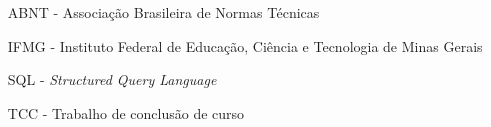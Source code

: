 \begin{itemize}[]
\item[ABNT] - Associação Brasileira de Normas Técnicas
\item[IFMG] - Instituto Federal de Educação, Ciência e Tecnologia de Minas Gerais
\item[SQL] - \textit{Structured Query Language}
\item[TCC] - Trabalho de conclusão de curso
\end{itemize}
